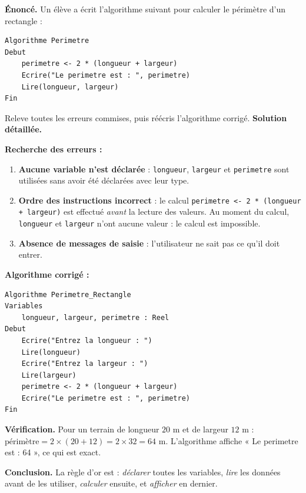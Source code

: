 \documentclass[11pt]{article}
\begin{document}
\begin{exoresolu}
\textbf{Énoncé.} Un élève a écrit l'algorithme suivant pour calculer le périmètre d'un rectangle :
\begin{lstlisting}
Algorithme Perimetre
Debut
    perimetre <- 2 * (longueur + largeur)
    Ecrire("Le perimetre est : ", perimetre)
    Lire(longueur, largeur)
Fin
\end{lstlisting}
Releve toutes les erreurs commises, puis réécris l'algorithme corrigé.
\tcblower
\textbf{Solution détaillée.}

\textbf{Recherche des erreurs :}
\begin{enumerate}
  \item \textbf{Aucune variable n'est déclarée} : \texttt{longueur}, \texttt{largeur} et \texttt{perimetre} sont utilisées sans avoir été déclarées avec leur type.
  \item \textbf{Ordre des instructions incorrect} : le calcul \texttt{perimetre <- 2 * (longueur + largeur)} est effectué \emph{avant} la lecture des valeurs. Au moment du calcul, \texttt{longueur} et \texttt{largeur} n'ont aucune valeur : le calcul est impossible.
  \item \textbf{Absence de messages de saisie} : l'utilisateur ne sait pas ce qu'il doit entrer.
\end{enumerate}

\textbf{Algorithme corrigé :}
\begin{lstlisting}
Algorithme Perimetre_Rectangle
Variables
    longueur, largeur, perimetre : Reel
Debut
    Ecrire("Entrez la longueur : ")
    Lire(longueur)
    Ecrire("Entrez la largeur : ")
    Lire(largeur)
    perimetre <- 2 * (longueur + largeur)
    Ecrire("Le perimetre est : ", perimetre)
Fin
\end{lstlisting}

\textbf{Vérification.} Pour un terrain de longueur $20$ m et de largeur $12$ m : $\text{périmètre} = 2 \times (20 + 12) = 2 \times 32 = 64$ m. L'algorithme affiche « Le perimetre est : 64 », ce qui est exact.

\textbf{Conclusion.} La règle d'or est : \emph{déclarer} toutes les variables, \emph{lire} les données avant de les utiliser, \emph{calculer} ensuite, et \emph{afficher} en dernier.
\end{exoresolu}
\end{document}
